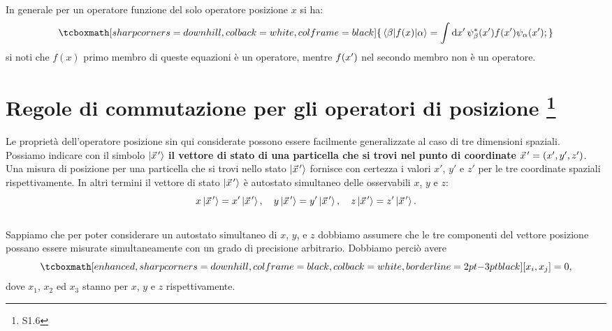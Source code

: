 \documentclass[a4paper,12pt,oneside]{book}
\begin{document}
In generale per un operatore funzione del solo operatore posizione $x$ si ha:
	\begin{equation}
		\tcboxmath[sharp corners=downhill, colback=white, colframe=black]{
			\mel{\beta}{f(x)}{\alpha} = \int\dd{x'}\psi_{\beta}^*\qty(x')f\qty(x')\psi_{\alpha}\qty(x') ;
			}
	\end{equation}
si noti che $f(x)$ primo membro di queste equazioni è un operatore, mentre $f\qty(x')$ nel secondo membro non è un operatore.
\section[Regole di commutazione per gli operatori di posizione]{Regole di commutazione per gli operatori di posizione \footnote{S1.6}}
Le proprietà dell'operatore posizione sin qui considerate possono essere facilmente generalizzate al caso di tre dimensioni spaziali.\\

Possiamo indicare con il simbolo $\ket{\vec{x}^{\, \prime}}$ \textbf{il vettore di stato di una particella che si trovi nel punto di coordinate ${\vec{x}}^{\, \prime}= \qty(x',y',z')$}.\\

Una misura di posizione per una particella che si trovi nello stato $\ket{\vec{x}^{\, \prime}}$ fornisce con certezza i valori $x'$, $y'$ e $z'$ per le tre coordinate spaziali rispettivamente. In altri termini il vettore di stato $\ket{\vec{x}^{\, \prime}}$ è autostato simultaneo delle osservabili $x$, $y$ e $z$:
	\begin{equation}
		x\ket{\vec{x}^{\, \prime}}=x'\ket{\vec{x}^{\, \prime}},\quad y\ket{\vec{x}^{\, \prime}}=y'\ket{\vec{x}^{\, \prime}},\quad z\ket{\vec{x}^{\, \prime}}=z'\ket{\vec{x}^{\, \prime}} .
	\end{equation}\\
	
Sappiamo che per poter considerare un autostato simultaneo di $x$, $y$, e $z$ dobbiamo assumere che le tre componenti del vettore posizione possano essere misurate simultaneamente con un grado di precisione arbitrario. Dobbiamo perciò avere
	\begin{equation}
		\tcboxmath[enhanced, sharp corners=downhill, colframe=black, colback=white, borderline={2pt}{-3pt}{black}]{
			\comm{x_i}{x_j}= 0 ,
			}
	\end{equation}
dove $x_1$, $x_2$ ed $x_3$ stanno per $x$, $y$ e $z$ rispettivamente.
\end{document}
